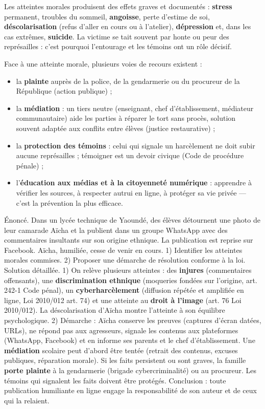 \documentclass[11pt]{article}
\newcounter{popsec}
\newcounter{popsub}
\newcommand{\courssub}[1]{%
  \stepcounter{popsub}%
  \par\vspace{9pt}\noindent{\popxbold\fontsize{11.5}{13}\selectfont\color{popink}{\color{poporange}\thepopsec.\thepopsub}\hspace{6pt}#1}\par\nopagebreak\vspace{4pt}
}
\begin{document}
\courssub{Conséquences psychologiques et voies de recours}

Les atteintes morales produisent des effets graves et documentés : \textbf{stress} permanent, troubles du sommeil, \textbf{angoisse}, perte d'estime de soi, \textbf{déscolarisation} (refus d'aller en cours ou à l'atelier), \textbf{dépression} et, dans les cas extrêmes, \textbf{suicide}. La victime se tait souvent par honte ou peur des représailles : c'est pourquoi l'entourage et les témoins ont un rôle décisif.

Face à une atteinte morale, plusieurs voies de recours existent :
\begin{itemize}
\item la \textbf{plainte} auprès de la police, de la gendarmerie ou du procureur de la République (action publique) ;
\item la \textbf{médiation} : un tiers neutre (enseignant, chef d'établissement, médiateur communautaire) aide les parties à réparer le tort sans procès, solution souvent adaptée aux conflits entre élèves (justice restaurative) ;
\item la \textbf{protection des témoins} : celui qui signale un harcèlement ne doit subir aucune représailles ; témoigner est un devoir civique (Code de procédure pénale) ;
\item l'\textbf{éducation aux médias et à la citoyenneté numérique} : apprendre à vérifier les sources, à respecter autrui en ligne, à protéger sa vie privée — c'est la prévention la plus efficace.
\end{itemize}

\begin{exoresolu}
Énoncé. Dans un lycée technique de Yaoundé, des élèves détournent une photo de leur camarade Aïcha et la publient dans un groupe WhatsApp avec des commentaires insultants sur son origine ethnique. La publication est reprise sur Facebook. Aïcha, humiliée, cesse de venir en cours. 1) Identifier les atteintes morales commises. 2) Proposer une démarche de résolution conforme à la loi.
\tcblower
Solution détaillée. 1) On relève plusieurs atteintes : des \textbf{injures} (commentaires offensants), une \textbf{discrimination ethnique} (moqueries fondées sur l'origine, art. 242-1 Code pénal), un \textbf{cyberharcèlement} (diffusion répétée et amplifiée en ligne, Loi 2010/012 art. 74) et une atteinte au \textbf{droit à l'image} (art. 76 Loi 2010/012). La déscolarisation d'Aïcha montre l'atteinte à son équilibre psychologique. 2) Démarche : Aïcha conserve les preuves (captures d'écran datées, URLs), ne répond pas aux agresseurs, signale les contenus aux plateformes (WhatsApp, Facebook) et en informe ses parents et le chef d'établissement. Une \textbf{médiation} scolaire peut d'abord être tentée (retrait des contenus, excuses publiques, réparation morale). Si les faits persistent ou sont graves, la famille \textbf{porte plainte} à la gendarmerie (brigade cybercriminalité) ou au procureur. Les témoins qui signalent les faits doivent être protégés. Conclusion : toute publication humiliante en ligne engage la responsabilité de son auteur et de ceux qui la relaient.
\end{exoresolu}
\end{document}
